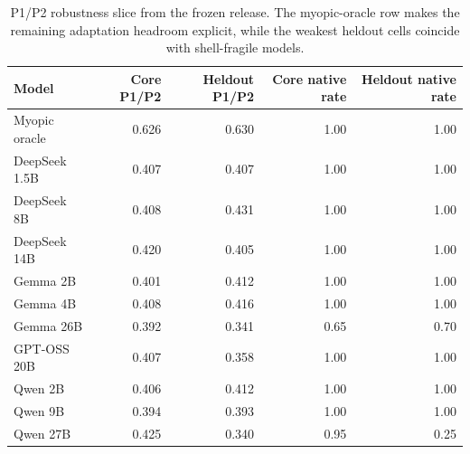 \begin{table}[t]
  \centering
  \scriptsize
  \setlength{\tabcolsep}{4pt}
  \begin{tabular}{lrrrr}
    \toprule
    Model & Core P1/P2 & Heldout P1/P2 & Core native rate & Heldout native rate \\
    \midrule
    Myopic oracle & 0.626 & 0.630 & 1.00 & 1.00 \\
    \midrule
    DeepSeek 1.5B & 0.407 & 0.407 & 1.00 & 1.00 \\
    DeepSeek 8B & 0.408 & 0.431 & 1.00 & 1.00 \\
    DeepSeek 14B & 0.420 & 0.405 & 1.00 & 1.00 \\
    Gemma 2B & 0.401 & 0.412 & 1.00 & 1.00 \\
    Gemma 4B & 0.408 & 0.416 & 1.00 & 1.00 \\
    Gemma 26B & 0.392 & 0.341 & 0.65 & 0.70 \\
    GPT-OSS 20B & 0.407 & 0.358 & 1.00 & 1.00 \\
    Qwen 2B & 0.406 & 0.412 & 1.00 & 1.00 \\
    Qwen 9B & 0.394 & 0.393 & 1.00 & 1.00 \\
    Qwen 27B & 0.425 & 0.340 & 0.95 & 0.25 \\
    \bottomrule
  \end{tabular}
  \caption{P1/P2 robustness slice from the frozen release. The myopic-oracle
  row makes the remaining adaptation headroom explicit, while the weakest
  heldout cells coincide with shell-fragile models.}
  \label{tab:anchorslice}
\end{table}
